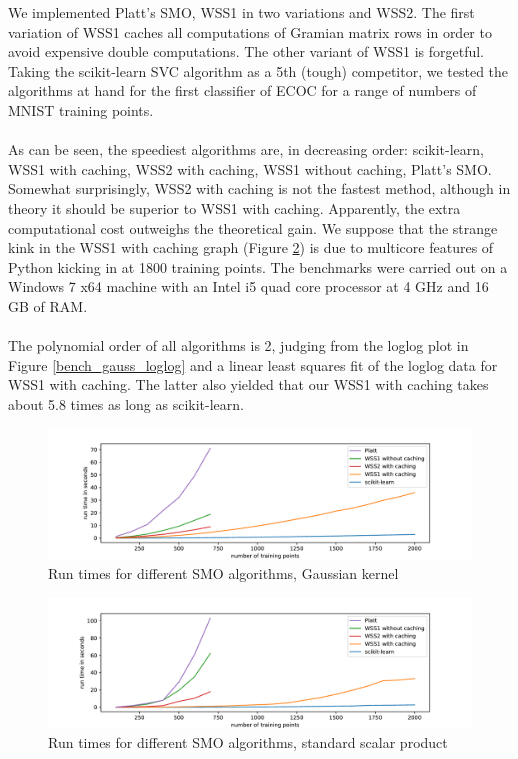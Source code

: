 We implemented Platt's SMO, WSS1 in two variations and WSS2. The first variation of WSS1 caches all computations of Gramian matrix rows in order to avoid expensive double computations. The other variant of WSS1 is forgetful. Taking the scikit-learn SVC algorithm as a 5th (tough) competitor, we tested the algorithms at hand for the first classifier of ECOC for a range of numbers of MNIST training points. \\\\
As can be seen, the speediest algorithms are, in decreasing order: scikit-learn, WSS1 with caching, WSS2 with caching, WSS1 without caching, Platt's SMO. Somewhat surprisingly, WSS2 with caching is not the fastest method, although in theory it should be superior to WSS1 with caching. Apparently, the extra computational cost outweighs the theoretical gain. We suppose that the strange kink in the WSS1 with caching graph (Figure \ref{bench_ssp}) is due to multicore features of Python kicking in at 1800 training points. The benchmarks were carried out on a Windows 7 x64 machine with an Intel i5 quad core processor at 4 GHz and 16 GB of RAM.\\\\
The polynomial order of all algorithms is 2, judging from the loglog plot in Figure \ref{bench_gauss_loglog} and a linear least squares fit of the loglog data for WSS1 with caching. The latter also yielded that our WSS1 with caching takes about 5.8 times as long as scikit-learn.

\begin{figure}[h!]
	\includegraphics[width=1\textwidth, center]{benchplot_gauss.pdf}
	\caption{Run times for different SMO algorithms, Gaussian kernel}
	\label{bench_gauss}
\end{figure}

\begin{figure}[h!]
	\includegraphics[width=1\textwidth, center]{benchplot_ssp.pdf}
	\caption{Run times for different SMO algorithms, standard scalar product}
	\label{bench_ssp}
\end{figure}

